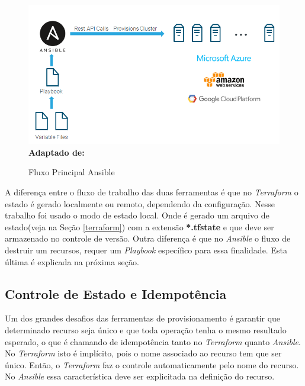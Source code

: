 \begin{figure}[H]
	\centering	
	\caption[\hspace{0.1cm}Fluxo Principal Ansible]{Fluxo Principal Ansible}
	\vspace{-0.4cm}
	\includegraphics[width=1.0\textwidth]{artigo/figuras/Ansible_workflow2.png}
	 \vspace{-0.2cm}
	\\\textbf{\footnotesize Adaptado de: \cite{cloudera}}
	\label{fig:figura10}
\end{figure}
\vspace{-0.5cm}

\hfill




A diferença entre o fluxo de trabalho das duas ferramentas é que no \textit{Terraform} o estado é gerado localmente ou remoto, dependendo da configuração. Nesse trabalho foi usado o modo de estado local. Onde é gerado um arquivo de estado(veja na Seção \ref{terraform}) com a extensão \textbf{*.tfstate} e que deve ser armazenado no controle de versão. Outra diferença é que no \textit{Ansible} o fluxo de destruir um recursos, requer um \textit{Playbook} específico para essa finalidade. Esta última é explicada na próxima seção.  

\subsection{Controle de Estado e Idempotência} \label{idem}
Um dos grandes desafios das ferramentas de provisionamento é garantir que determinado recurso seja único e que toda operação tenha o mesmo resultado esperado, o que é chamando de idempotência tanto no \textit{Terraform} quanto \textit{Ansible}. No \textit{Terraform} isto é implícito, pois o nome associado ao recurso tem que ser único. Então, o \textit{Terraform} faz o controle automaticamente pelo nome do recurso. No \textit{Ansible} essa característica deve ser  explicitada  na definição do recurso.

